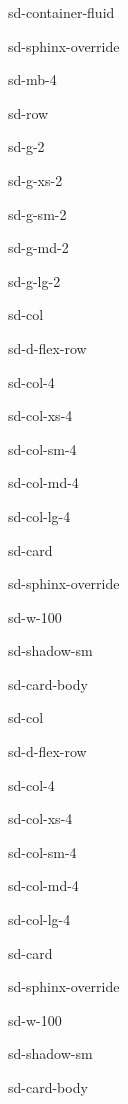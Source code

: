 \documentclass[letterpaper,10pt,english]{jupyterBook}
\begin{document}
\begin{sphinxuseclass}{sd-container-fluid}
\begin{sphinxuseclass}{sd-sphinx-override}
\begin{sphinxuseclass}{sd-mb-4}
\begin{sphinxuseclass}{sd-row}
\begin{sphinxuseclass}{sd-g-2}
\begin{sphinxuseclass}{sd-g-xs-2}
\begin{sphinxuseclass}{sd-g-sm-2}
\begin{sphinxuseclass}{sd-g-md-2}
\begin{sphinxuseclass}{sd-g-lg-2}
\begin{sphinxuseclass}{sd-col}
\begin{sphinxuseclass}{sd-d-flex-row}
\begin{sphinxuseclass}{sd-col-4}
\begin{sphinxuseclass}{sd-col-xs-4}
\begin{sphinxuseclass}{sd-col-sm-4}
\begin{sphinxuseclass}{sd-col-md-4}
\begin{sphinxuseclass}{sd-col-lg-4}
\begin{sphinxuseclass}{sd-card}
\begin{sphinxuseclass}{sd-sphinx-override}
\begin{sphinxuseclass}{sd-w-100}
\begin{sphinxuseclass}{sd-shadow-sm}
\begin{sphinxuseclass}{sd-card-body}
\end{sphinxuseclass}
\end{sphinxuseclass}
\end{sphinxuseclass}
\end{sphinxuseclass}
\end{sphinxuseclass}
\end{sphinxuseclass}
\end{sphinxuseclass}
\end{sphinxuseclass}
\end{sphinxuseclass}
\end{sphinxuseclass}
\end{sphinxuseclass}
\end{sphinxuseclass}
\begin{sphinxuseclass}{sd-col}
\begin{sphinxuseclass}{sd-d-flex-row}
\begin{sphinxuseclass}{sd-col-4}
\begin{sphinxuseclass}{sd-col-xs-4}
\begin{sphinxuseclass}{sd-col-sm-4}
\begin{sphinxuseclass}{sd-col-md-4}
\begin{sphinxuseclass}{sd-col-lg-4}
\begin{sphinxuseclass}{sd-card}
\begin{sphinxuseclass}{sd-sphinx-override}
\begin{sphinxuseclass}{sd-w-100}
\begin{sphinxuseclass}{sd-shadow-sm}
\begin{sphinxuseclass}{sd-card-body}


\begin{figure}[htbp]
\centering

\noindent{}
\end{figure}




\end{sphinxuseclass}
\end{sphinxuseclass}
\end{sphinxuseclass}
\end{sphinxuseclass}
\end{sphinxuseclass}
\end{sphinxuseclass}
\end{sphinxuseclass}
\end{sphinxuseclass}
\end{sphinxuseclass}
\end{sphinxuseclass}
\end{sphinxuseclass}
\end{sphinxuseclass}
\end{sphinxuseclass}
\end{sphinxuseclass}
\end{sphinxuseclass}
\end{sphinxuseclass}
\end{sphinxuseclass}
\end{sphinxuseclass}
\end{sphinxuseclass}
\end{sphinxuseclass}
\end{sphinxuseclass}
\end{document}

